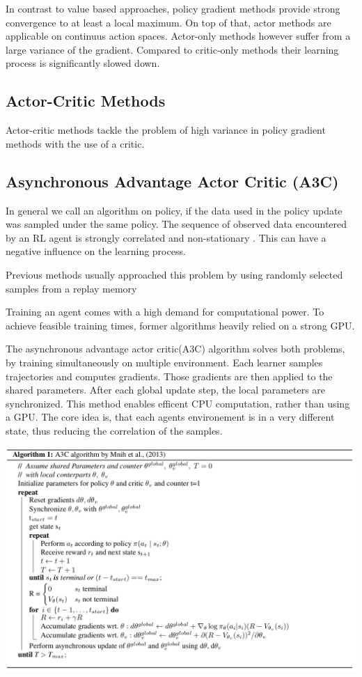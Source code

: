 In contrast to value based approaches, policy gradient methods provide strong convergence to at least a local maximum.
On top of that, actor methods are applicable on continuus action spaces.
 \citep{Sutton00policygradient}
Actor-only methods however suffer from a large variance of the gradient. Compared to critic-only methods their learning process is significantly slowed down. \citep{Grondman12}
 

\subsection{Actor-Critic Methods}

Actor-critic methods tackle the problem of high variance in policy gradient methods with the use of a critic. 
\pagebreak

\subsection{Asynchronous Advantage Actor Critic (A3C)}

In general we call an algorithm on policy, if the data used in the policy update was sampled under the same policy. The sequence of observed data encountered by an RL agent is strongly correlated and non-stationary \citep{A3C}. This can have a negative influence on the learning process.

Previous methods usually approached this problem by using randomly selected samples from a replay memory \citep{mnih2015atari}

Training an agent comes with a high demand for computational power. To achieve feasible training times, former algorithms heavily relied on a strong GPU.

The asynchronous advantage actor critic(A3C) algorithm solves both problems, by training simultaneously on multiple environment.
Each learner samples trajectories and computes gradients. Those gradients are then applied to the shared parameters. 
After each global update step, the local parameters are synchronized.
This method enables efficent CPU computation, rather than using a GPU.
The core idea is, that each agents environement is in a very different state, thus reducing the correlation of the samples.
 
\includegraphics[scale=0.3]{bilder/aaac.png}

